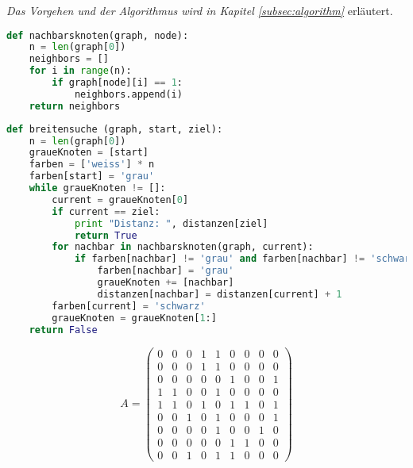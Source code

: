 


\begin{lsg}
\textit{Das Vorgehen und der Algorithmus wird in Kapitel \ref{subsec:algorithm}} erl\"autert.
\end{lsg}


\begin{lsg}
\hfill
\begin{lstlisting}[language=Python,basicstyle=\small,tabsize=3]
def nachbarsknoten(graph, node):
	n = len(graph[0])
	neighbors = []
	for i in range(n):
		if graph[node][i] == 1:
			neighbors.append(i)
	return neighbors
\end{lstlisting}
\end{lsg}

\begin{lsg}
\hfill
\begin{lstlisting}[language=Python,basicstyle=\small,tabsize=3]
def breitensuche (graph, start, ziel):
	n = len(graph[0])
	graueKnoten = [start]
	farben = ['weiss'] * n
	farben[start] = 'grau'
	while graueKnoten != []:
		current = graueKnoten[0]
		if current == ziel:
			print "Distanz: ", distanzen[ziel]
			return True
		for nachbar in nachbarsknoten(graph, current):
			if farben[nachbar] != 'grau' and farben[nachbar] != 'schwarz':
				farben[nachbar] = 'grau'
				graueKnoten += [nachbar]
				distanzen[nachbar] = distanzen[current] + 1
		farben[current] = 'schwarz'
		graueKnoten = graueKnoten[1:]
	return False
\end{lstlisting}
\end{lsg}

\begin{lsg}
\[A =  \begin{pmatrix}
  0 & 0 & 0 & 1 & 1 & 0 & 0 & 0 & 0  \\
  0 & 0 & 0 & 1 & 1 & 0 & 0 & 0 & 0  \\
  0 & 0 & 0 & 0 & 0 & 1 & 0 & 0 & 1  \\
  1 & 1 & 0 & 0 & 1 & 0 & 0 & 0 & 0  \\
  1 & 1 & 0 & 1 & 0 & 1 & 1 & 0 & 1  \\
  0 & 0 & 1 & 0 & 1 & 0 & 0 & 0 & 1  \\
  0 & 0 & 0 & 0 & 1 & 0 & 0 & 1 & 0  \\
  0 & 0 & 0 & 0 & 0 & 1 & 1 & 0 & 0  \\
  0 & 0 & 1 & 0 & 1 & 1 & 0 & 0 & 0 
 \end{pmatrix}
  \]
\end{lsg}

